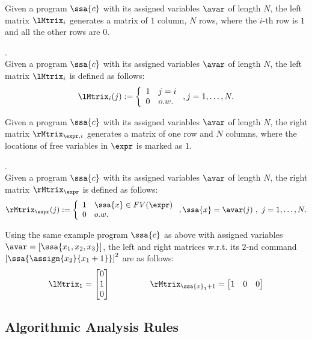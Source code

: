 Given a program  $\ssa{c}$ with its assigned variables $\avar$ of length $N$,
the left matrix $\lMtrix_i$ generates a matrix of $1$ column, $N$ rows, 
where the $i$-th row is $1$ and all the other rows are $0$.
%
\begin{defn}.
\\
Given a program  $\ssa{c}$ with its assigned variables $\avar$ of length $N$, 
the left matrix $\lMtrix_i$ is defined as follows:
\[
	\lMtrix_i(j) : = 
	\left
	\{
	\begin{array}{ll}
	1 & j = i \\
	0 & o.w.
	\end{array}
	\right.,
	j = 1, \ldots, N.
\]
\end{defn}
%
Given a program  $\ssa{c}$ with its assigned variables $\avar$ of length $N$,
the right matrix $\rMtrix_{\expr, i}$ generates a matrix of one row and $N$ columns, 
where the locations of free variables in $\expr$ is marked as $1$. 
%
%
\begin{defn}.
\\
Given a program  $\ssa{c}$ with its assigned variables $\avar$ of length $N$, 
the right matrix $\rMtrix_{\expr}$ is defined as follows:
\[
	\rMtrix_{\expr}(j) : = 
	\left\{
	\begin{array}{ll}
	1 & \ssa{x} \in FV(\expr) 
	\\
	0 & o.w.
	\end{array}
	\right.,
	\ssa{x} = \avar(j) ~ , ~ j = 1, \ldots, N.
\]
%
%
\end{defn}
%
Using the same example program $\ssa{c}$ as above with assigned variables $\avar = [ \ssa{x_1 , x_2 , x_3} ] $,
the left and right matrices w.r.t. its $2$-nd command 
$\left[\ssa{\assign {x_2} {x_1 + 1}}\right]^2$  are as follows:
\[
\lMtrix_1 = \left[ \begin{matrix}
 0   \\
 1 	 \\
 0   \\
\end{matrix}   \right ] 
~~~~~~~~~~~~~~
\rMtrix_{\ssa{x}_1 + 1}
= \left[ \begin{matrix} 
   1 & 0 & 0 \\
\end{matrix}  \right]
\]
%
%
%
\subsection{Algorithmic Analysis Rules}
%
